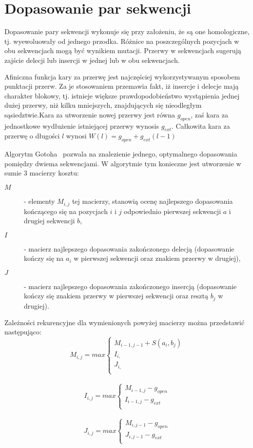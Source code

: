\documentclass[a4paper,10pt]{article}
\begin{document}
	\section{Dopasowanie par sekwencji}

	Dopasowanie pary sekwencji wykonuje się przy założeniu, że są one homologiczne, tj. wyewoluowały od jednego przodka. Różnice na poszczególnych pozycjach w obu sekwencjach mogą być wynikiem mutacji. Przerwy w sekwencjach sugerują zajście delecji lub insercji w jednej lub w obu sekwencjach.

	Afiniczna funkcja kary za przerwę jest najczęściej wykorzystywanym sposobem punktacji przerw. Za je stosowaniem przemawia fakt, iż insercje i delecje mają charakter blokowy, tj. istnieje większe prawdopodobieństwo wystąpienia jednej dużej przerwy, niż kilku mniejszych, znajdujących się nieodległym sąsiedztwie.Kara za utworzenie nowej przerwy jest równa $g_{open}$, zaś kara za jednostkowe wydłużenie istniejącej przerwy wynosis $g_{ext}$. Całkowita kara za przerwę o długości $l$ wynosi \mbox{$W(l) = g_{open} + g_{ext}(l - 1)$}

	Algorytm Gotoha~\cite{gotoh} pozwala na znalezienie jednego, optymalnego dopasowania  pomiędzy dwiema sekwencjami. W algorytmie tym konieczne jest utworzenie w sumie 3 macierzy kosztu:
	\begin{description}
	\item[$M$]
	 - elementy $M_{i,j}$ tej macierzy, stanowią ocenę najlepszego dopasowania kończącego się na pozycjach $i$ i $j$ odpowiednio pierwszej sekwencji $a$ i drugiej sekwencji $b$,
	\item[$I$]
	 - macierz najlepszego dopasowania zakończonego delecją (dopasowanie kończy się na $a_i$ w pierwszej sekwencji oraz znakiem przerwy w drugiej),
	\item[$J$]
	 - macierz najlepszego dopasowania zakończonego insercją (dopasowanie kończy się znakiem przerwy w pierwszej sekwencji oraz resztą $b_j$ w drugiej).
	\end{description}
	Zależności rekurencyjne dla wymienionych powyżej macierzy można przedstawić następująco:
	\[
		M_{i,j} = max \left\{
			\begin{array}{ll}
				M_{i-1, j-1} + S(a_i, b_j)\\
				I_{i, }\\
				J_{i, }\\
			\end{array} \right.
	\]\\
	\[
		I_{i,j} = max \left\{
			\begin{array}{ll}
				M_{i-1, j} - g_{open}\\
				I_{i-1, j} - g_{ext}\\
			\end{array} \right.
	\]\\
	\[
		J_{i,j} = max \left\{
			\begin{array}{ll}
				M_{i, j-1} - g_{open}\\
				J_{i, j-1} - g_{ext}\\
			\end{array} \right.
	\]
\end{document}
